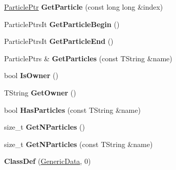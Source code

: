 \begin{DoxyCompactItemize}
\item 
\hypertarget{class_h_a_l_1_1_generic_data_a4956f4b4014bc1a7d32ad7399d622cba}{\hyperlink{class_h_a_l_1_1_generic_particle}{Particle\+Ptr} {\bfseries Get\+Particle} (const long long \&index)}\label{class_h_a_l_1_1_generic_data_a4956f4b4014bc1a7d32ad7399d622cba}

\item 
\hypertarget{class_h_a_l_1_1_generic_data_a601843b8bfda4d43a99cd46069b19d6c}{Particle\+Ptrs\+It {\bfseries Get\+Particle\+Begin} ()}\label{class_h_a_l_1_1_generic_data_a601843b8bfda4d43a99cd46069b19d6c}

\item 
\hypertarget{class_h_a_l_1_1_generic_data_a98b91768f0b886ac87611be8c7c490cd}{Particle\+Ptrs\+It {\bfseries Get\+Particle\+End} ()}\label{class_h_a_l_1_1_generic_data_a98b91768f0b886ac87611be8c7c490cd}

\item 
\hypertarget{class_h_a_l_1_1_generic_data_a88a50155c0cdc7dd76d681dcfb45dfc4}{Particle\+Ptrs \& {\bfseries Get\+Particles} (const T\+String \&name)}\label{class_h_a_l_1_1_generic_data_a88a50155c0cdc7dd76d681dcfb45dfc4}

\item 
\hypertarget{class_h_a_l_1_1_generic_data_a265c6f842139f2f7c8a12ff82962a15d}{bool {\bfseries Is\+Owner} ()}\label{class_h_a_l_1_1_generic_data_a265c6f842139f2f7c8a12ff82962a15d}

\item 
\hypertarget{class_h_a_l_1_1_generic_data_a444b2f7bd6c6e8ba6d585088f194928f}{T\+String {\bfseries Get\+Owner} ()}\label{class_h_a_l_1_1_generic_data_a444b2f7bd6c6e8ba6d585088f194928f}

\item 
\hypertarget{class_h_a_l_1_1_generic_data_a05638e168b83e998c8d1c1b58cfef9d2}{bool {\bfseries Has\+Particles} (const T\+String \&name)}\label{class_h_a_l_1_1_generic_data_a05638e168b83e998c8d1c1b58cfef9d2}

\item 
\hypertarget{class_h_a_l_1_1_generic_data_a521637ed1d84af87cf0ef5432893576f}{size\+\_\+t {\bfseries Get\+N\+Particles} ()}\label{class_h_a_l_1_1_generic_data_a521637ed1d84af87cf0ef5432893576f}

\item 
\hypertarget{class_h_a_l_1_1_generic_data_a0d2533aa45faf37a56b820f2b3a0d7d5}{size\+\_\+t {\bfseries Get\+N\+Particles} (const T\+String \&name)}\label{class_h_a_l_1_1_generic_data_a0d2533aa45faf37a56b820f2b3a0d7d5}

\item 
\hypertarget{class_h_a_l_1_1_generic_data_a737f93b6a0d228a7a7b8146cf6e151ea}{{\bfseries Class\+Def} (\hyperlink{class_h_a_l_1_1_generic_data}{Generic\+Data}, 0)}\label{class_h_a_l_1_1_generic_data_a737f93b6a0d228a7a7b8146cf6e151ea}

\end{DoxyCompactItemize}
